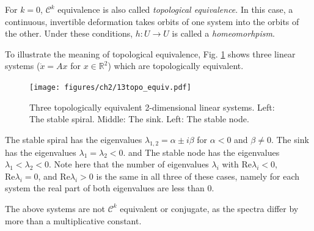 \begin{definition}
	For $k=0$, $\mathcal{C}^{k}$ equivalence is also called \emph{topological equivalence}. In this case, a continuous, invertible deformation takes orbits of one system into the orbits of the other. Under these conditions,  $h:U\to U$ is called a \emph{homeomorhpism}.
\end{definition}

\begin{ex}[Topologically equivalent linear systems for $n=2$]
	To illustrate the meaning of topological equivalence, Fig. \ref{fig:topo_equiv} shows three linear systems ($\dot{{x} } = {Ax}  $ for $x\in \mathbb{R}^2$) which are topologically equivalent.
	\begin{figure}[h!]
		\centering
		\texttt{[image: figures/ch2/13topo\_equiv.pdf]}
		\caption{Three topologically equivalent 2-dimensional linear systems. Left: The stable spiral. Middle: The sink. Left: The stable node.}
		\label{fig:topo_equiv}
	\end{figure}

The stable spiral has the eigenvalues $\lambda _{1,2}= \alpha \pm i \beta $ for $\alpha <0$ and $\beta \neq 0$. The sink has the eigenvalues $\lambda_1=\lambda_2<0$. and The stable node has the eigenvalues $\lambda_1 < \lambda_2 < 0$. Note here that the number of eigenvalues $\lambda_i$ with $ \textrm{Re} \lambda_i <0$, $ \textrm{Re} \lambda _i=0$, and $ \textrm{Re} \lambda _i>0$ is the same in all three of these cases, namely for each system the real part of both eigenvalues are less than 0.	
\end{ex}

\begin{remark}[]
	The above systems are not $\mathcal{C}^k$ equivalent or conjugate, as the spectra differ by more than a multiplicative constant.
\end{remark}


